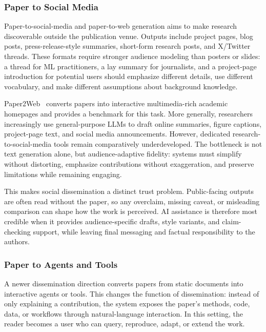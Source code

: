 \documentclass{llmxive}
\begin{document}
\subsubsection{Paper to Social Media}
\label{sec:paper2social}

Paper-to-social-media and paper-to-web generation aims to make research discoverable outside the publication venue. Outputs include project pages, blog posts, press-release-style summaries, short-form research posts, and X/Twitter threads. These formats require stronger audience modeling than posters or slides: a thread for ML practitioners, a lay summary for journalists, and a project-page introduction for potential users should emphasize different details, use different vocabulary, and make different assumptions about background knowledge.

Paper2Web~\cite{paper2web2025} converts papers into interactive multimedia-rich academic homepages and provides a benchmark for this task. More generally, researchers increasingly use general-purpose LLMs to draft online summaries, figure captions, project-page text, and social media announcements. However, dedicated research-to-social-media tools remain comparatively underdeveloped. The bottleneck is not text generation alone, but audience-adaptive fidelity: systems must simplify without distorting, emphasize contributions without exaggeration, and preserve limitations while remaining engaging.

This makes social dissemination a distinct trust problem. Public-facing outputs are often read without the paper, so any overclaim, missing caveat, or misleading comparison can shape how the work is perceived. AI assistance is therefore most credible when it provides audience-specific drafts, style variants, and claim-checking support, while leaving final messaging and factual responsibility to the authors.



\subsubsection{Paper to Agents and Tools}
\label{sec:paper2agent}

A newer dissemination direction converts papers from static documents into interactive agents or tools. This changes the function of dissemination: instead of only explaining a contribution, the system exposes the paper's methods, code, data, or workflows through natural-language interaction. In this setting, the reader becomes a user who can query, reproduce, adapt, or extend the work.
\end{document}
